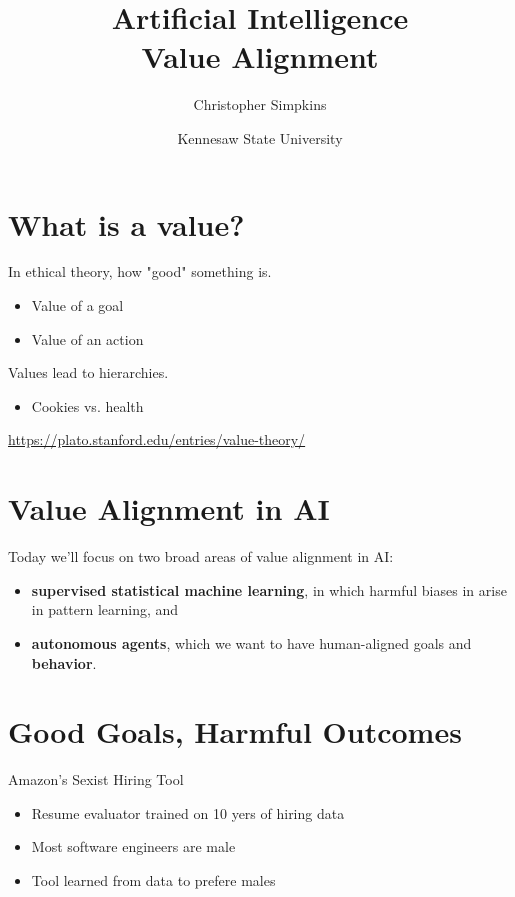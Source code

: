 \documentclass[11pt]{article}
\author{Christopher Simpkins}
\date{Kennesaw State University}
\title{Artificial Intelligence\\\medskip
\large Value Alignment}
\begin{document}
\maketitle
\section{What is a value?}
\label{sec:orgfed653e}

In ethical theory, how "good" something is.

\begin{itemize}
\item Value of a goal
\item Value of an action
\end{itemize}

Values lead to hierarchies.

\begin{itemize}
\item Cookies vs. health
\end{itemize}

\url{https://plato.stanford.edu/entries/value-theory/}
\section{Value Alignment in AI}
\label{sec:orgc49df39}

Today we'll focus on two broad areas of value alignment in AI:

\begin{itemize}
\item \textbf{supervised statistical machine learning}, in which harmful biases in arise in pattern learning, and
\item \textbf{autonomous agents}, which we want to have human-aligned goals and \textbf{behavior}.
\end{itemize}
\section{Good Goals, Harmful Outcomes}
\label{sec:orgb2f288b}

Amazon's Sexist Hiring Tool

\begin{itemize}
\item Resume evaluator trained on 10 yers of hiring data
\item Most software engineers are male
\item Tool learned from data to prefere males
\end{itemize}
\end{document}
